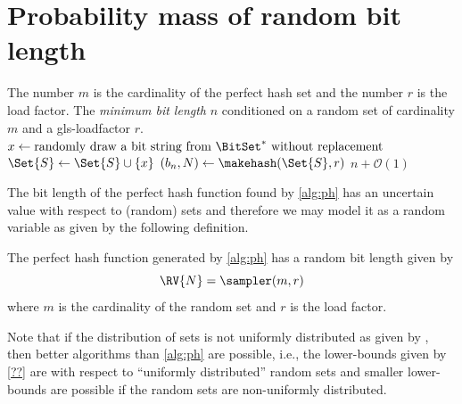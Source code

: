 \documentclass[ ../main.tex]{subfiles}
\begin{document}
\appendix
\appendixpage
\addappheadtotoc
\section{Probability mass of random bit length}
\begin{algorithm}
    \caption{Bit length sampler of the cryptographic perfect hash function}
    \label{alg:sampler}
    \KwIn
    {
        The number $m$ is the cardinality of the perfect hash set and
        the number $r$ is the load factor.
    }
    \KwOut
    {
        The \emph{minimum bit length} $n$ conditioned on a random set of cardinality $m$ and a \gls{gls-loadfactor} $r$.
    }
    {
        {
            $x \gets \text{randomly draw a bit string from $\BitSet^{*}$ without replacement}$\;
            $\Set{S} \gets \Set{S} \cup \{x\}$\;
        }    
        $(b_n,N) \gets \makehash\!\left(\Set{S}, r\right)$\;
        \Return $n + \mathcal{O}(1)$\;
    }
\end{algorithm}
The bit length of the perfect hash function found by \cref{alg:ph} has an uncertain value with respect to (random) sets and therefore we may model it as a random variable as given by the following definition.
\begin{definition}
\label{def:N_rv}
The perfect hash function generated by \cref{alg:ph} has a random bit length given by
\begin{equation}
    \RV{N} = \sampler(m,r)
\end{equation}
where $m$ is the cardinality of the random set and $r$ is the load factor.
\end{definition}
Note that if the distribution of sets is not uniformly distributed as given by 
\sampler, then better algorithms than \cref{alg:ph} are possible, i.e., the 
lower-bounds given by \cref{??} are with respect to ``uniformly distributed'' 
random sets and smaller lower-bounds are possible if the random sets are 
non-uniformly distributed.
\end{document}
